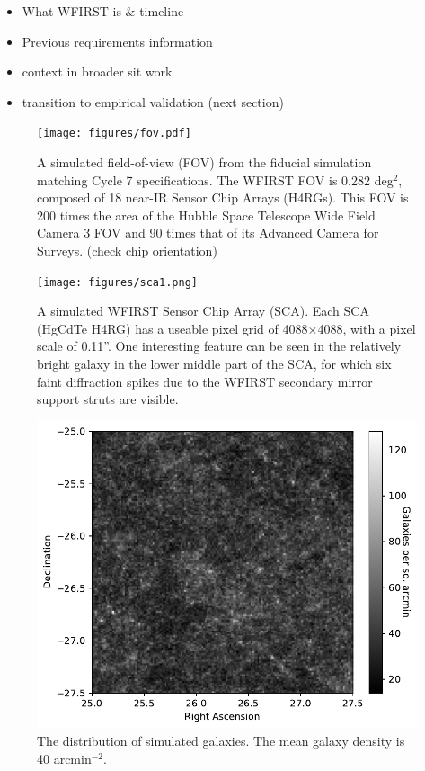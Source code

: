 \documentclass[aps,prd, amsmath,amssymb,superscriptaddress,showkeys,nofootinbib,reprint,preprintnumbers]{revtex4-1}
\begin{document}
\begin{itemize}
\item What WFIRST is \& timeline
\item Previous requirements information
\item context in broader sit work
\item transition to empirical validation (next section)
\end{itemize}


\begin{figure}
\begin{center}
\texttt{[image: figures/fov.pdf]}
\end{center}
\caption[]{
A simulated field-of-view (FOV) from the fiducial simulation matching Cycle 7 specifications. The WFIRST FOV is 0.282 deg$^2$, composed of 18 near-IR Sensor Chip Arrays (H4RGs). This FOV is 200 times the area of the Hubble Space Telescope Wide Field Camera 3 FOV and 90 times that of its Advanced Camera for Surveys. (check chip orientation)
\label{fig:fov}}
\end{figure}

\begin{figure}
\begin{center}
\texttt{[image: figures/sca1.png]}
\end{center}
\caption[]{
A simulated WFIRST Sensor Chip Array (SCA). Each SCA (HgCdTe H4RG) has a useable pixel grid of 4088$\times$4088, with a pixel scale of 0.11''. One interesting feature can be seen in the relatively bright galaxy in the lower middle part of the SCA, for which six faint diffraction spikes due to the WFIRST secondary mirror support struts are visible.
\label{fig:sca}}
\end{figure}

\begin{figure}
\begin{center}
\includegraphics[width=\columnwidth]{figures/galaxies.pdf}
\end{center}
\caption[]{
The distribution of simulated galaxies. The mean galaxy density is 40 arcmin$^{-2}$. 
\label{fig:galaxies}}
\end{figure}
\end{document}
